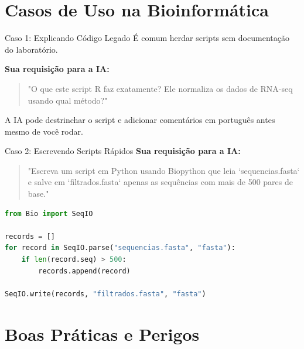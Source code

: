 \section{Casos de Uso na Bioinformática}

\begin{frame}[fragile]{Caso 1: Explicando Código Legado}
É comum herdar scripts sem documentação do laboratório.

\vspace{0.2cm}
\textbf{Sua requisição para a IA:}
\begin{quote}
"O que este script R faz exatamente? Ele normaliza os dados de RNA-seq usando qual método?"
\end{quote}

\vspace{0.2cm}
A IA pode destrinchar o script e adicionar comentários em português antes mesmo de você rodar.
\end{frame}

\begin{frame}[fragile]{Caso 2: Escrevendo Scripts Rápidos}
\textbf{Sua requisição para a IA:}
\begin{quote}
"Escreva um script em Python usando Biopython que leia `sequencias.fasta` e salve em `filtrados.fasta` apenas as sequências com mais de 500 pares de base."
\end{quote}

\vspace{0.2cm}
\begin{lstlisting}[language=Python, caption=Código gerado pela IA, basicstyle=\ttfamily\footnotesize]
from Bio import SeqIO

records = []
for record in SeqIO.parse("sequencias.fasta", "fasta"):
    if len(record.seq) > 500:
        records.append(record)

SeqIO.write(records, "filtrados.fasta", "fasta")
\end{lstlisting}
\end{frame}

\section{Boas Práticas e Perigos}

